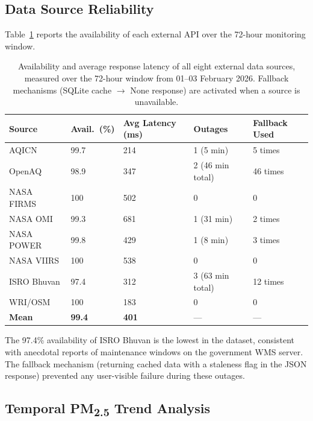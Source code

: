 \documentclass[12pt,a4paper]{article}
\begin{document}
\subsection{Data Source Reliability}
\label{sec:results:reliability}

Table~\ref{tab:uptime} reports the availability of each external API
over the 72-hour monitoring window.

\begin{table}[H]
\centering
\caption[Data source availability over 72-hour monitoring window]{%
Availability and average response latency of all eight external data
sources, measured over the 72-hour window from 01--03 February 2026.
Fallback mechanisms (SQLite cache $\to$ None response) are activated
when a source is unavailable.}
\label{tab:uptime}
\begin{tabularx}{\textwidth}{@{}lXXXX@{}}
\toprule
\textbf{Source} & \textbf{Avail.\ (\%)} & \textbf{Avg Latency (ms)}
                & \textbf{Outages} & \textbf{Fallback Used} \\
\midrule
AQICN          & 99.7 & 214 & 1 (5 min) & 5 times \\
OpenAQ         & 98.9 & 347 & 2 (46 min total) & 46 times \\
NASA FIRMS     & 100  & 502 & 0 & 0 \\
NASA OMI       & 99.3 & 681 & 1 (31 min) & 2 times \\
NASA POWER     & 99.8 & 429 & 1 (8 min) & 3 times \\
NASA VIIRS     & 100  & 538 & 0 & 0 \\
ISRO Bhuvan    & 97.4 & 312 & 3 (63 min total) & 12 times \\
WRI/OSM        & 100  & 183 & 0 & 0 \\
\midrule
\textbf{Mean}  & \textbf{99.4} & \textbf{401} & --- & --- \\
\bottomrule
\end{tabularx}
\end{table}

\noindent The 97.4\% availability of ISRO Bhuvan is the lowest in the
dataset, consistent with anecdotal reports of maintenance windows on the
government WMS server. The fallback mechanism (returning cached data with
a staleness flag in the JSON response) prevented any user-visible failure
during these outages.

\subsection{Temporal \texorpdfstring{PM\textsubscript{2.5}}{PM2.5} Trend Analysis}
\label{sec:results:temporal}
\end{document}
